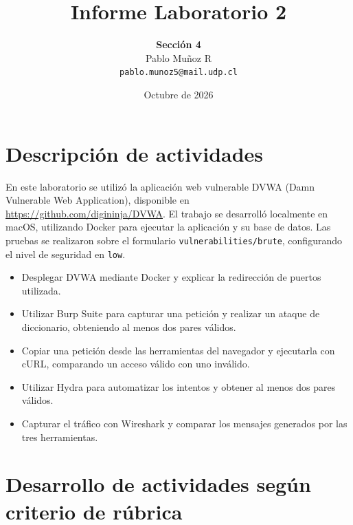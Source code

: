 \documentclass[letterpaper,12pt]{article}
\begin{document}
\title{\Huge Informe Laboratorio 2}
\author{\textbf{Sección 4}\\Pablo Muñoz R\\\texttt{pablo.munoz5@mail.udp.cl}}
\date{Octubre de 2026}
\maketitle
\tableofcontents
\newpage
\section{Descripción de actividades}
En este laboratorio se utilizó la aplicación web vulnerable DVWA (Damn Vulnerable Web Application), disponible en \url{https://github.com/digininja/DVWA}. El trabajo se desarrolló localmente en macOS, utilizando Docker para ejecutar la aplicación y su base de datos. Las pruebas se realizaron sobre el formulario \texttt{vulnerabilities/brute}, configurando el nivel de seguridad en \texttt{low}.
\begin{itemize}
\item Desplegar DVWA mediante Docker y explicar la redirección de puertos utilizada.
\item Utilizar Burp Suite para capturar una petición y realizar un ataque de diccionario, obteniendo al menos dos pares válidos.
\item Copiar una petición desde las herramientas del navegador y ejecutarla con cURL, comparando un acceso válido con uno inválido.
\item Utilizar Hydra para automatizar los intentos y obtener al menos dos pares válidos.
\item Capturar el tráfico con Wireshark y comparar los mensajes generados por las tres herramientas.
\end{itemize}
\section{Desarrollo de actividades según criterio de rúbrica}
\end{document}
